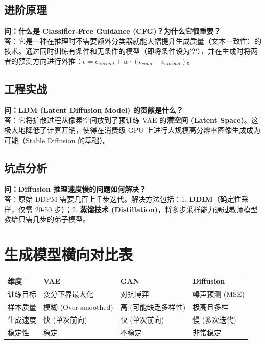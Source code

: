 \documentclass[12pt, a4paper]{article}
\begin{document}
\subsection{进阶原理}
\textbf{问：什么是 Classifier-Free Guidance (CFG)？为什么它很重要？}\\
答：它是一种在推理时不需要额外分类器就能大幅提升生成质量（文本一致性）的技术。通过同时训练有条件和无条件的模型（即将条件设为空），并在生成时将两者的预测方向进行外推：$\tilde{\epsilon} = \epsilon_{uncond} + w \cdot (\epsilon_{cond} - \epsilon_{uncond})$。

\subsection{工程实战}
\textbf{问：LDM (Latent Diffusion Model) 的贡献是什么？}\\
答：它将扩散过程从像素空间放到了预训练 VAE 的\textbf{潜空间 (Latent Space)}。这极大地降低了计算开销，使得在消费级 GPU 上进行大规模高分辨率图像生成成为可能（Stable Diffusion 的基础）。

\subsection{坑点分析}
\textbf{问：Diffusion 推理速度慢的问题如何解决？}\\
答：原始 DDPM 需要几百上千步迭代。解决方法包括：1. \textbf{DDIM}（确定性采样，仅需 20-50 步）；2. \textbf{蒸馏技术 (Distillation)}，将多步采样能力通过教师模型教给只需几步的弟子模型。

\section{生成模型横向对比表}

\begin{table}[h]
\centering
\begin{tabularx}{\textwidth}{|l|X|X|X|}
\hline
\textbf{维度} & \textbf{VAE} & \textbf{GAN} & \textbf{Diffusion} \\
\hline
训练目标 & 变分下界最大化 & 对抗博弈 & 噪声预测 (MSE) \\
\hline
样本质量 & 模糊 (Over-smoothed) & 高 (可能缺乏多样性) & 极高且多样 \\
\hline
生成速度 & 快 (单次前向) & 快 (单次前向) & 慢 (多次迭代) \\
\hline
稳定性 & 稳定 & 不稳定 & 非常稳定 \\
\hline
\end{tabularx}
\end{table}
\end{document}
